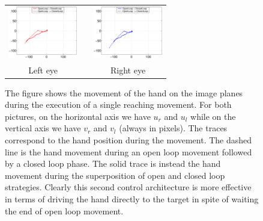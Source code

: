 \begin{figure}
  \begin{center}
	\begin{tabular}{ccc}
	  \parbox{30mm}{\includegraphics[width=30mm]{Figure/LeftEyeOpenVSClosedLoop.eps}}  & \hspace{.1cm} &
	  \parbox{30mm}{\includegraphics[width=30mm]{Figure/RightEyeOpenVSClosedLoop.eps}}
	  \\
	  \parbox{30mm}{\centering Left eye } & \hspace{.1cm} & \parbox{30mm}{\centering Right eye }
  \end{tabular}
\end{center}
\caption{The figure shows the movement of the hand on the image planes 
during the execution of a single reaching movement. For both pictures, 
on the horizontal axis 
we have $u_r$ and $u_l$ while on the vertical axis we have $v_r$ and $v_l$ (always in pixels).
The traces correspond to the hand position during the movement. The dashed line is the hand movement
during an open loop movement followed by a closed loop phase. The solid trace is instead the hand movement during 
the superposition of open and closed loop strategies. Clearly this second control architecture is more effective 
in terms of driving the hand directly to the target in spite of waiting the end of open loop movement.}\label{Fig:TimeResponseOpenVSClosedLoopErrors}
  \end{figure}
  
